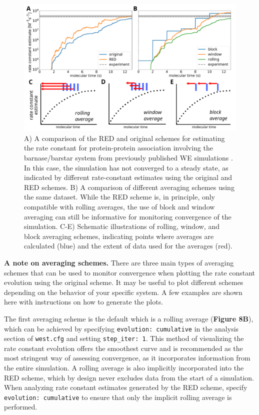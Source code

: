 \begin{figure}[ht]
\centering
\includegraphics[width=\columnwidth]{figures/Figure8_analysis.pdf}
\caption{A) A comparison of the RED and original schemes for estimating the rate constant for protein-protein association involving the barnase/barstar system from previously published WE simulations \citep{saglam_proteinprotein_2019}.
In this case, the simulation has not converged to a steady state, as indicated by different rate-constant estimates using the original and RED schemes.
B) A comparison of different averaging schemes using the same dataset.
While the RED scheme is, in principle, only compatible with rolling averages, the use of block and window averaging can still be informative for monitoring convergence of the simulation.
C-E) Schematic illustrations of rolling, window, and block averaging schemes, indicating points where averages are calculated (blue) and the extent of data used for the averages (red).}
\end{figure}

\textbf{A note on averaging schemes.} 
There are three main types of averaging schemes that can be used to monitor convergence when plotting the rate constant evolution using the original scheme.
It may be useful to plot different schemes depending on the behavior of your specific system.
A few examples are shown here with instructions on how to generate the plots.

The first averaging scheme is the default which is a rolling average (\textbf{Figure 8B}), which can be achieved by specifying \verb|evolution: cumulative| in the analysis section of \verb|west.cfg| and setting \verb|step_iter: 1|.
This method of visualizing the rate constant evolution offers the smoothest curve and is recommended as the most stringent way of assessing convergence, as it incorporates information from the entire simulation.
A rolling average is also implicitly incorporated into the RED scheme, which by design never excludes data from the start of a simulation.
When analyzing rate constant estimates generated by the RED scheme, specify \verb|evolution: cumulative| to ensure that only the implicit rolling average is performed.

